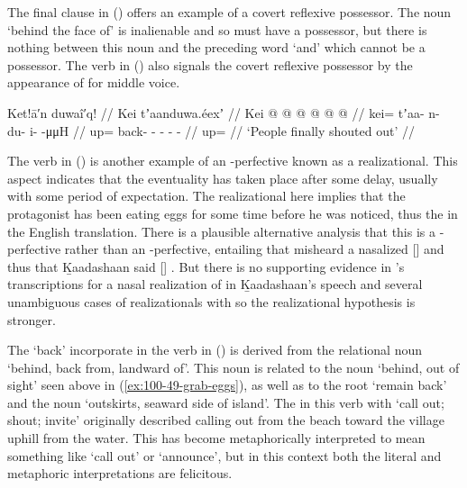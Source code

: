 The final clause in (\lastx) offers an example of a covert reflexive possessor.
The noun  ‘behind the face of’ is inalienable and so must have a possessor, but there is nothing between this noun and the preceding word  ‘and’ which cannot be a possessor.
The verb  in (\lastx) also signals the covert reflexive possessor by the appearance of  for middle voice.

\ex\label{ex:100-50-call-out}%
%
\begingl
	\glpreamble	Ket!ā′n duwaî′q! //
	\glpreamble	Kei tʼaanduwa.éexʼ //
	\gla	Kei @  @ {} @ {} @ {} @ {} @ {} //
	\glb	kei= tʼaa- n- du- i-  -μμH //
	\glc	up= back- - - -  - //
	\gld	up=  {} {} {} {} {} //
	\glft	‘People finally shouted out’
		//
\endgl
\xe

The verb in (\lastx) is another example of an -perfective known as a realizational.
This aspect indicates that the eventuality has taken place after some delay, usually with some period of expectation.
The realizational here implies that the protagonist has been eating eggs for some time before he was noticed, thus the  in the English translation.
There is a plausible alternative analysis that this is a -perfective rather than an -perfective, entailing that \citeauthor{swanton:1909} misheard a nasalized  [] and thus that Ḵaadashaan said  [] \parencite[cf.][150 fn.\ 35]{krauss-leer:1981}.
But there is no supporting evidence in \citeauthor{swanton:1909}’s transcriptions for a nasal realization of  in Ḵaadashaan’s speech and several unambiguous cases of realizationals with  so the realizational hypothesis is stronger.

The  ‘back’ incorporate in the verb in (\lastx) is derived from the relational noun  ‘behind, back from, landward of’.
This noun is related to the noun  ‘behind, out of sight’ seen above in (\ref{ex:100-49-grab-eggs}), as well as to the root  ‘remain back’ and the noun  ‘outskirts, seaward side of island’.
The  in this verb with  ‘call out; shout; invite’ originally described calling out from the beach toward the village uphill from the water.
This has become metaphorically interpreted to mean something like ‘call out’ or ‘announce’, but in this context both the literal and metaphoric interpretations are felicitous.

